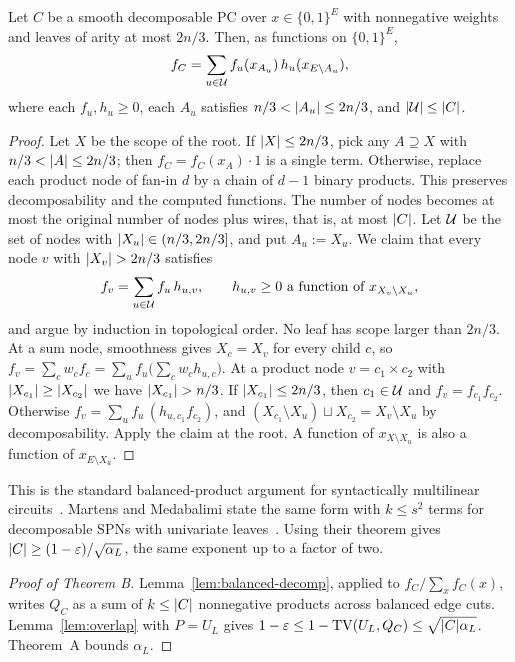 \begin{lemma}\label{lem:balanced-decomp}
Let $C$ be a smooth decomposable PC over $x\in\{0,1\}^E$ with nonnegative weights and leaves of arity at most $2n/3$. Then, as functions on $\{0,1\}^E$,
\[
  f_C=\sum_{u\in\mathcal{U}}f_u(x_{A_u})\,h_u(x_{E\setminus A_u}),
\]
where each $f_u,h_u\ge0$, each $A_u$ satisfies $n/3<\lvert A_u\rvert\le2n/3$, and $\lvert \mathcal{U}\rvert\le\lvert C\rvert$.
\end{lemma}

\begin{proof}
Let $X$ be the scope of the root. If $\lvert X\rvert\le2n/3$, pick any $A\supseteq X$ with $n/3<\lvert A\rvert\le2n/3$; then $f_C=f_C(x_A)\cdot1$ is a single term. Otherwise, replace each product node of fan-in $d$ by a chain of $d-1$ binary products. This preserves decomposability and the computed functions. The number of nodes becomes at most the original number of nodes plus wires, that is, at most $\lvert C\rvert$. Let $\mathcal{U}$ be the set of nodes with $\lvert X_u\rvert\in(n/3,2n/3]$, and put $A_u:=X_u$. We claim that every node $v$ with $\lvert X_v\rvert>2n/3$ satisfies
\[
  f_v=\sum_{u\in\mathcal{U}}f_u\,h_{u,v},\qquad h_{u,v}\ge0\ \text{a function of $x_{X_v\setminus X_u}$},
\]
and argue by induction in topological order. No leaf has scope larger than $2n/3$. At a sum node, smoothness gives $X_c=X_v$ for every child $c$, so $f_v=\sum_cw_cf_c=\sum_uf_u\bigl(\sum_cw_ch_{u,c}\bigr)$. At a product node $v=c_1\times c_2$ with $\lvert X_{c_1}\rvert\ge\lvert X_{c_2}\rvert$ we have $\lvert X_{c_1}\rvert>n/3$. If $\lvert X_{c_1}\rvert\le2n/3$, then $c_1\in\mathcal{U}$ and $f_v=f_{c_1}f_{c_2}$. Otherwise $f_v=\sum_uf_u\,(h_{u,c_1}f_{c_2})$, and $(X_{c_1}\setminus X_u)\sqcup X_{c_2}=X_v\setminus X_u$ by decomposability. Apply the claim at the root. A function of $x_{X\setminus X_u}$ is also a function of $x_{E\setminus X_u}$.
\end{proof}

This is the standard balanced-product argument for syntactically multilinear circuits~\cite{RazYehudayoff08}. Martens and Medabalimi state the same form with $k\le s^2$ terms for decomposable SPNs with univariate leaves~\cite[Thm.~38]{MartensMedabalimi14}. Using their theorem gives $\lvert C\rvert\ge(1-\varepsilon)/\sqrt{\alpha_L}$, the same exponent up to a factor of two.

\begin{proof}[Proof of Theorem B]
Lemma~\ref{lem:balanced-decomp}, applied to $f_C/\sum_xf_C(x)$, writes $Q_C$ as a sum of $k\le\lvert C\rvert$ nonnegative products across balanced edge cuts. Lemma~\ref{lem:overlap} with $P=U_L$ gives $1-\varepsilon\le1-\mathrm{TV}(U_L,Q_C)\le\sqrt{\lvert C\rvert\alpha_L}$. Theorem~A bounds $\alpha_L$.
\end{proof}

